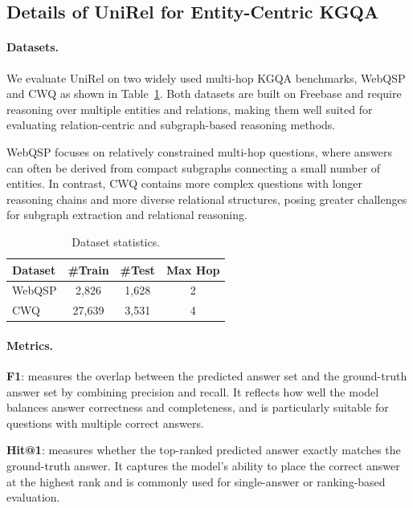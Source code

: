 \subsection{Details of UniRel for Entity-Centric KGQA}\label{sec:entity_centric_results_details}

\paragraph{Datasets.}

We evaluate UniRel on two widely used multi-hop KGQA benchmarks, WebQSP and CWQ as shown in Table~\ref{tab:dataset_stats}.
Both datasets are built on Freebase and require reasoning over multiple entities and relations, making them well suited for evaluating relation-centric and subgraph-based reasoning methods.

WebQSP focuses on relatively constrained multi-hop questions, where answers can often be derived from compact subgraphs connecting a small number of entities.
In contrast, CWQ contains more complex questions with longer reasoning chains and more diverse relational structures, posing greater challenges for subgraph extraction and relational reasoning.



\begin{table}[ht]
\centering
\small
\caption{Dataset statistics.}
\begin{tabular}{lccc}
\toprule
\textbf{Dataset} & \textbf{\#Train} & \textbf{\#Test} & \textbf{Max Hop} \\
\midrule
WebQSP & 2{,}826 & 1{,}628 & 2 \\
CWQ    & 27{,}639 & 3{,}531 & 4 \\
\bottomrule
\end{tabular}
\label{tab:dataset_stats}
\end{table}


\paragraph{Metrics.}
\textbf{F1}: measures the overlap between the predicted answer set and the ground-truth answer set by combining precision and recall.
It reflects how well the model balances answer correctness and completeness, and is particularly suitable for questions with multiple correct answers.

\textbf{Hit@1}: measures whether the top-ranked predicted answer exactly matches the ground-truth answer.
It captures the model’s ability to place the correct answer at the highest rank and is commonly used for single-answer or ranking-based evaluation.
